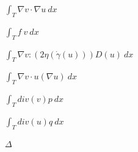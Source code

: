 \documentclass{article}
\begin{document}
$ \int_T \nabla v \cdot \nabla u ~dx$
\pagebreak

$ \int_T f ~ v ~dx $
\pagebreak

$ \int_T \nabla v : (2\eta(\Dot{\gamma}(u))) D(u) ~dx$
\pagebreak

$ \int_T \nabla v \cdot u(\nabla u) ~dx$
\pagebreak

$ \int_T  div(v) p ~dx$
\pagebreak

$ \int_T  div(u) q ~dx$
\pagebreak

$ \Delta $
\pagebreak
\end{document}
